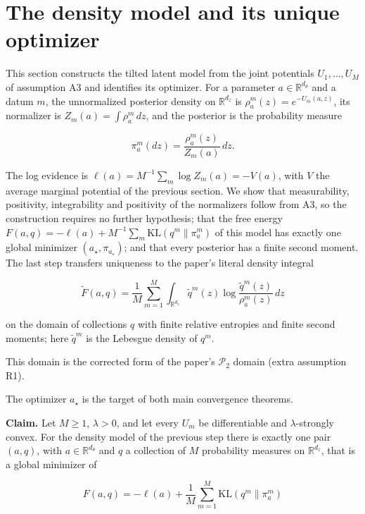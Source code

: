 \documentclass[11pt,a4paper]{report}
\begin{document}
\section{\texorpdfstring{The density model and its unique optimizer}{The density model and its unique optimizer}}


This section constructs the tilted latent model from the joint potentials \(U_1,\dots,U_M\) of assumption A3 and identifies its optimizer. For a parameter \(a\in\mathbb R^{d_\theta}\) and a datum \(m\), the unnormalized posterior density on \(\mathbb R^{d_z}\) is \(\rho_a^m(z)=e^{-U_m(a,z)}\), its normalizer is \(Z_m(a)=\int\rho_a^m\,dz\), and the posterior is the probability measure


\[\pi_a^m(dz)=\frac{\rho_a^m(z)}{Z_m(a)}\,dz.\]


The log evidence is \(\ell(a)=M^{-1}\sum_m\log Z_m(a)=-V(a)\), with \(V\) the average marginal potential of the previous section. We show that measurability, positivity, integrability and positivity of the normalizers follow from A3, so the construction requires no further hypothesis; that the free energy \(F(a,q)=-\ell(a)+M^{-1}\sum_m\mathrm{KL}(q^m\|\pi_a^m)\) of this model has exactly one global minimizer \((a_\star,\pi_{a_\star})\); and that every posterior has a finite second moment. The last step transfers uniqueness to the paper's literal density integral


\[\widetilde F(a,q)=\frac1M\sum_{m=1}^M\int_{\mathbb R^{d_z}}\tilde q^m(z)\log\frac{\tilde q^m(z)}{\rho_a^m(z)}\,dz\]


on the domain of collections \(q\) with finite relative entropies and finite second moments; here \(\tilde q^m\) is the Lebesgue density of \(q^m\).




This domain is the corrected form of the paper's \(\mathcal P_2\) domain (extra assumption R1).




The optimizer \(a_\star\) is the target of both main convergence theorems.



\textbf{Claim.} Let \(M\ge1\), \(\lambda>0\), and let every \(U_m\) be differentiable and \(\lambda\)-strongly convex. For the density model of the previous step there is exactly one pair \((a,q)\), with \(a\in\mathbb R^{d_\theta}\) and \(q\) a collection of \(M\) probability measures on \(\mathbb R^{d_z}\), that is a global minimizer of


\[F(a,q)=-\ell(a)+\frac1M\sum_{m=1}^M\mathrm{KL}(q^m\|\pi_a^m)\]
\end{document}
